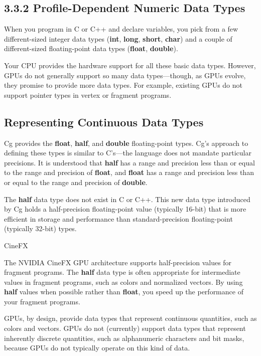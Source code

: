 \documentclass[../main.tex]{subfiles}
\begin{document}
\subsection{3.3.2 Profile-Dependent Numeric Data Types}

When you program in C or C++ and declare variables, you pick from a few different-sized integer data types (\textbf{int}, \textbf{long}, \textbf{short}, \textbf{char}) and a couple of different-sized floating-point data types (\textbf{float}, \textbf{double}).

Your CPU provides the hardware support for all these basic data types. However, GPUs do not generally support so many data types—though, as GPUs evolve, they promise to provide more data types. For example, existing GPUs do not support pointer types in vertex or fragment programs.

\subsection*{Representing Continuous Data Types}

Cg provides the \textbf{float}, \textbf{half}, and \textbf{double} floating-point types. Cg's approach to defining these types is similar to C's—the language does not mandate particular precisions. It is understood that \textbf{half} has a range and precision less than or equal to the range and precision of \textbf{float}, and \textbf{float} has a range and precision less than or equal to the range and precision of \textbf{double}.

The \textbf{half} data type does not exist in C or C++. This new data type introduced by Cg holds a half-precision floating-point value (typically 16-bit) that is more efficient in storage and performance than standard-precision floating-point (typically 32-bit) types.

\begin{framed}
CineFX

The NVIDIA CineFX GPU architecture supports half-precision values for fragment programs. The \textbf{half} data type is often appropriate for intermediate values in fragment programs, such as colors and normalized vectors. By using \textbf{half} values when possible rather than \textbf{float}, you speed up the performance of your fragment programs.
\end{framed}

GPUs, by design, provide data types that represent continuous quantities, such as colors and vectors. GPUs do not (currently) support data types that represent inherently discrete quantities, such as alphanumeric characters and bit masks, because GPUs do not typically operate on this kind of data.
\end{document}
